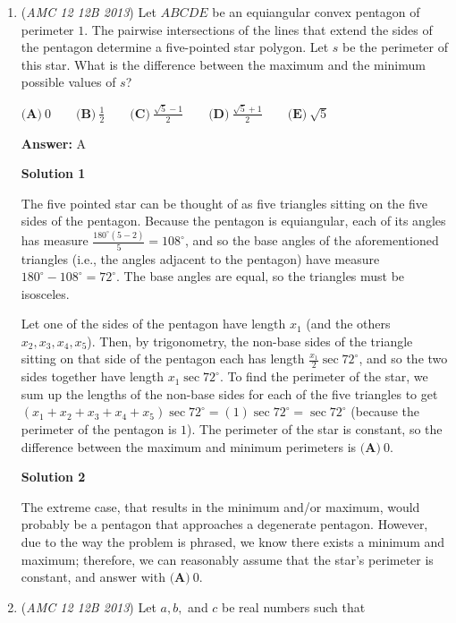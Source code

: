 \begin{enumerate}
	\item (\textit{AMC 12 12B 2013}) Let $ABCDE$ be an equiangular convex pentagon of perimeter $1$. The pairwise intersections of the lines that extend the sides of the pentagon determine a five-pointed star polygon. Let $s$ be the perimeter of this star. What is the difference between the maximum and the minimum possible values of $s$?


 $\textbf{(A)}\ 0 \qquad \textbf{(B)}\ \frac{1}{2} \qquad \textbf{(C)}\ \frac{\sqrt{5}-1}{2} \qquad \textbf{(D)}\  \frac{\sqrt{5}+1}{2} \qquad \textbf{(E)}\ \sqrt{5}$

 \textbf{Answer: }A



\textbf{Solution 1}

The five pointed star can be thought of as five triangles sitting on the five sides of the pentagon. Because the pentagon is equiangular, each of its angles has measure $\frac{180^\circ (5-2)}{5}=108^\circ$, and so the base angles of the aforementioned triangles (i.e., the angles adjacent to the pentagon) have measure $180^\circ - 108^\circ = 72^\circ$. The base angles are equal, so the triangles must be isosceles.

 Let one of the sides of the pentagon have length $x_1$ (and the others $x_2, x_3, x_4, x_5$). Then, by trigonometry, the non-base sides of the triangle sitting on that side of the pentagon each has length $\frac{x_1}{2} \sec 72^\circ$, and so the two sides together have length $x_1 \sec 72^\circ$. To find the perimeter of the star, we sum up the lengths of the non-base sides for each of the five triangles to get $(x_1+x_2+x_3+x_4+x_5) \sec 72^\circ = (1) \sec 72^\circ = \sec 72^\circ$ (because the perimeter of the pentagon is $1$). The perimeter of the star is constant, so the difference between the maximum and minimum perimeters is $\boxed{\textbf{(A)} \ 0}$.

 



\textbf{Solution 2}

The extreme case, that results in the minimum and/or maximum, would probably be a pentagon that approaches a degenerate pentagon. However, due to the way the problem is phrased, we know there exists a minimum and maximum; therefore, we can reasonably assume that the star's perimeter is constant, and answer with $\boxed{\textbf{(A)} \ 0}$.

 


	\item (\textit{AMC 12 12B 2013}) Let $a,b,$ and $c$ be real numbers such that 



\end{enumerate}
